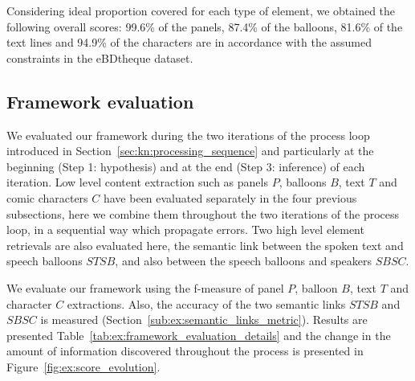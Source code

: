 Considering ideal proportion covered for each type of element, we obtained the following overall scores: 99.6\% of the panels, 87.4\% of the balloons, 81.6\% of the text lines and 94.9\% of the characters are in accordance with the assumed constraints in the eBDtheque dataset.
%

\subsection{Framework evaluation}
We evaluated our framework during the two iterations of the process loop introduced in Section~\ref{sec:kn:processing_sequence} and particularly at the beginning (Step 1: hypothesis) and at the end (Step 3: inference) of each iteration.
Low level content extraction such as panels $P$, balloons $B$, text $T$ and comic characters $C$ have been evaluated separately in the four previous subsections, here we combine them throughout the two iterations of the process loop, in a sequential way which propagate errors.
Two high level element retrievals are also evaluated here, the semantic link between the spoken text and speech balloons $STSB$, and also between the speech balloons and speakers $SBSC$.

We evaluate our framework using the f-measure of panel $P$, balloon $B$, text $T$ and character $C$ extractions.
Also, the accuracy of the two semantic links $STSB$ and $SBSC$ is measured (Section~\ref{sub:ex:semantic_links_metric}).
Results are presented Table~\ref{tab:ex:framework_evaluation_details} and the change in the amount of information discovered throughout the process is presented in Figure~\ref{fig:ex:score_evolution}.


